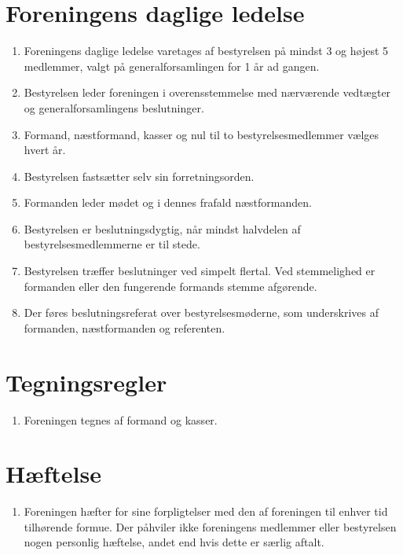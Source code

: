 \documentclass[a4paper, 10pt]{article}
\newenvironment{stykenum}{
  \begin{enumerate}[%
    label=Stk.~\arabic*:, ref=\textsection~\theenumi~Stk.~\arabic*, start=1]
}{\end{enumerate}}
\begin{document}
\section{Foreningens daglige ledelse}
\begin{stykenum}
    \item Foreningens daglige ledelse varetages af bestyrelsen på mindst 3 og
        højest 5 medlemmer, valgt på generalforsamlingen for 1 år ad gangen.

    \item Bestyrelsen leder foreningen i overensstemmelse med nærværende
        vedtægter og generalforsamlingens beslutninger.

    \item Formand, næstformand, kasser og nul til to bestyrelsesmedlemmer vælges
        hvert år.

    \item Bestyrelsen fastsætter selv sin forretningsorden.

    \item Formanden leder mødet og i dennes frafald næstformanden.

    \item Bestyrelsen er beslutningsdygtig, når mindst halvdelen af
        bestyrelsesmedlemmerne er til stede.

    \item Bestyrelsen træffer beslutninger ved simpelt flertal. Ved stemmelighed
        er formanden eller den fungerende formands stemme afgørende.

    \item Der føres beslutningsreferat over bestyrelsesmøderne, som underskrives
        af formanden, næstformanden og referenten.
\end{stykenum}

\section{Tegningsregler}
\begin{stykenum}
    \item Foreningen tegnes af formand og kasser.
\end{stykenum}

\section{Hæftelse}
\begin{stykenum}
    \item Foreningen hæfter for sine forpligtelser med den af foreningen til
        enhver tid tilhørende formue. Der påhviler ikke foreningens medlemmer
        eller bestyrelsen nogen personlig hæftelse, andet end hvis dette er
        særlig aftalt.
\end{stykenum}
\end{document}
